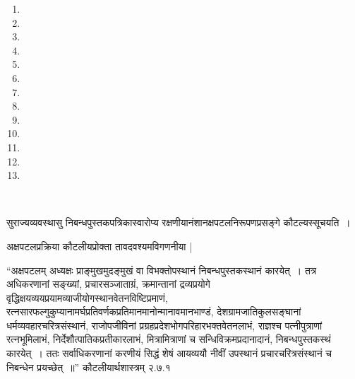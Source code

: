 \begin{enumerate}
\item {}
 
 \item {}

 \item {}

 \item {}

 \item {}

 \item {}

 \item {}

 \item {}

 \item {}

 \item {}

 \item {}

 \item {}

 \item {}

\end{enumerate}


~\hfill {}

सुराज्यव्यवस्थासु निबन्धपुस्तकपत्रिकास्वारोप्य रक्षणीयानंशानक्षपटलनिरूपणप्रसङ्गे कौटल्यस्सूचयति~।

अक्षपटलप्रक्रिया कौटलीयप्रोक्ता तावदवश्यमविगणनीया |

“अक्षपटलम् अध्यक्षः प्राङ्मुखमुदङ्मुखं वा विभक्तोपस्थानं निबन्धपुस्तकस्थानं कारयेत्~। तत्र अधिकरणानां सङ्ख्यां, प्रचारसञ्जाताग्रं, क्रमान्तानां द्रव्यप्रयोगे वृद्धिक्षयव्ययप्रयामव्याजीयोगस्थानवेतनविष्टिप्रमाणं, रत्नसारफल्गुकुप्यानामर्घप्रतिवर्णकप्रतिमानमानोन्मानावमानभाण्डं, देशग्रामजातिकुलसङ्घानां धर्मव्यवहारचरित्रसंस्थानं, राजोपजीविनां प्रग्रहप्रदेशभोगपरिहारभक्तवेतनलाभं, राज्ञश्च पत्नीपुत्राणां रत्नभूमिलाभं, निर्देशौत्पातिकप्रतीकारलाभं, मित्रामित्राणां च सन्धिविक्रमप्रदानादानं, निबन्धपुस्तकस्थं कारयेत्~। ततः सर्वाधिकरणानां करणीयं सिद्धं शेषं आयव्ययौ नीवीं उपस्थानं प्रचारचरित्रसंस्थानं च निबन्धेन प्रयच्छेत्~॥” \hfill कौटलीयार्थशास्त्रम् २.७.१

